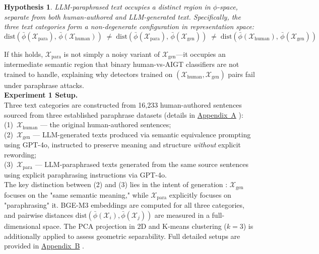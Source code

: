 \documentclass[runningheads]{llncs}
\newcommand{\appref}[1]{%
  \href{https://github.com/JonathanZha47/PadBen-Paraphrase-Attack-Benchmark/blob/main/docs/padben_icann_appendix.pdf}{Appendix~#1}%
}
\newtheorem{hypothesis}{Hypothesis}
\begin{document}
\begin{hypothesis}
\label{hyp:semantic_displacement}
LLM-paraphrased text occupies a distinct region in $\phi$-space,
separate from both human-authored and LLM-generated text. Specifically, 
the three text categories form a non-degenerate configuration in 
representation space:
\begin{equation}
    \text{dist}\!\left(\bar{\phi}(\mathcal{X}_{\text{para}}),\,
    \bar{\phi}(\mathcal{X}_{\text{human}})\right)
    \;\neq\;
    \text{dist}\!\left(\bar{\phi}(\mathcal{X}_{\text{para}}),\,
    \bar{\phi}(\mathcal{X}_{\text{gen}})\right)
    \;\neq\;
    \text{dist}\!\left(\bar{\phi}(\mathcal{X}_{\text{human}}),\,
    \bar{\phi}(\mathcal{X}_{\text{gen}})\right)
    \label{eq:h1}
\end{equation}

\end{hypothesis}
\noindent If this holds, $\mathcal{X}_{\text{para}}$ is not simply a noisy
variant of $\mathcal{X}_{\text{gen}}$---it occupies an intermediate
semantic region that binary human-vs-AIGT classifiers are not trained
to handle, explaining why detectors trained on
$(\mathcal{X}_{\text{human}}, \mathcal{X}_{\text{gen}})$ pairs
fail under paraphrase attacks. \\
\noindent\textbf{Experiment 1 Setup.} \\
Three text categories are constructed from 16,233 human-authored sentences sourced from three established 
paraphrase datasets (details in \appref{A}): \\
(1)~$\mathcal{X}_{\text{human}}$ --- the original human-authored sentences; \\
(2)~$\mathcal{X}_{\text{gen}}$ --- LLM-generated texts produced via 
semantic equivalence prompting using GPT-4o, instructed to preserve 
meaning and structure \textit{without} explicit rewording;\\ 
(3)~$\mathcal{X}_{\text{para}}$ --- LLM-paraphrased texts generated from 
the same source sentences using explicit paraphrasing instructions via 
GPT-4o. \\
The key distinction between (2) and (3) lies in the intent of generation
: $\mathcal{X}_{\text{gen}}$ focuses on the "same semantic meaning," while 
$\mathcal{X}_{\text{para}}$ explicitly focuses on "paraphrasing" it. BGE-M3 embeddings 
are computed for all three categories, and pairwise distances 
$\text{dist}(\bar{\phi}(\mathcal{X}_i), \bar{\phi}(\mathcal{X}_j))$ 
are measured in a full-dimensional space. The PCA projection in 2D and 
K-means clustering ($k=3$) is additionally applied to assess geometric 
separability. Full detailed setups are provided in \appref{B}.
\end{document}

